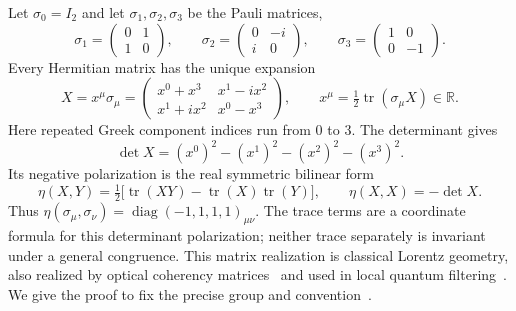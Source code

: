 Let $\sigma_0=I_2$ and let $\sigma_1,\sigma_2,\sigma_3$ be the Pauli matrices,
\begin{equation}
\sigma_1=\begin{pmatrix}0&1\\1&0\end{pmatrix},\qquad
\sigma_2=\begin{pmatrix}0&-i\\i&0\end{pmatrix},\qquad
\sigma_3=\begin{pmatrix}1&0\\0&-1\end{pmatrix}.
\end{equation}
Every Hermitian matrix has the unique expansion
\begin{equation}
X=x^\mu\sigma_\mu=
\begin{pmatrix}x^0+x^3&x^1-ix^2\\x^1+ix^2&x^0-x^3\end{pmatrix},\qquad
x^\mu=\tfrac12\operatorname{tr}(\sigma_\mu X)\in\mathbb R.
\label{eq:lor-hermitian-coordinates}
\end{equation}
Here repeated Greek component indices run from $0$ to $3$. The determinant gives
\begin{equation}
\det X=(x^0)^2-(x^1)^2-(x^2)^2-(x^3)^2.
\label{eq:lor-determinant}
\end{equation}
Its negative polarization is the real symmetric bilinear form
\begin{equation}
\eta(X,Y)=\tfrac12\bigl[\operatorname{tr}(XY)-\operatorname{tr}(X)\operatorname{tr}(Y)\bigr],
\qquad \eta(X,X)=-\det X.
\label{eq:lor-polarization}
\end{equation}
Thus $\eta(\sigma_\mu,\sigma_\nu)=\operatorname{diag}(-1,1,1,1)_{\mu\nu}$. The trace terms are a coordinate formula for this determinant polarization; neither trace separately is invariant under a general congruence. This matrix realization is classical Lorentz geometry, also realized by optical coherency matrices~\cite{HanKimNoz1997Stokes} and used in local quantum filtering~\cite{VerstraeteDehaeneDeMoor2001Filtering}. We give the proof to fix the precise group and convention~\cite[Sec.~III]{SimonEtAl2006LorentzTurns}.


